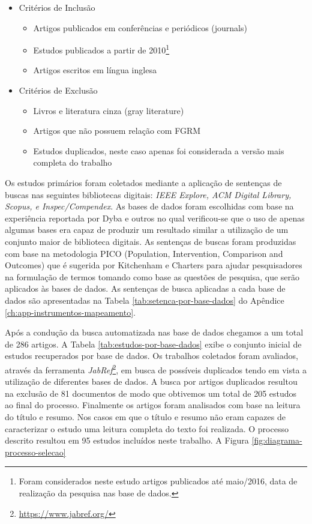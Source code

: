 \documentclass[msc]{ppgccufmg} %
\begin{document}
\begin{itemize}
	\item Critérios de Inclusão
		\begin{itemize}
			 \item Artigos publicados em conferências e periódicos (journals)
			 \item Estudos publicados a partir de 2010\footnote{Foram considerados neste estudo artigos publicados até maio/2016, data de realização da pesquisa nas base de dados.}
			 \item Artigos escritos em língua inglesa
		\end{itemize}
	\item Critérios de Exclusão
		\begin{itemize}
			\item Livros e literatura cinza (gray literature)
			\item Artigos que não possuem relação com FGRM
			\item Estudos duplicados, neste caso apenas foi considerada a versão mais completa do trabalho
		\end{itemize}
\end{itemize}

Os estudos primários foram coletados mediante a aplicação de sentenças de buscas nas seguintes bibliotecas digitais: \textit{IEEE Explore, ACM Digital Library, Scopus, e Inspec/Compendex}. As bases de dados foram escolhidas com base na experiência reportada por Dyba e outros \cite{dybaa2007applying}  no qual verificou-se que o uso de apenas algumas bases era capaz de produzir um resultado similar a utilização de um conjunto maior de biblioteca digitais. As sentenças de buscas foram produzidas com base na metodologia PICO (Population, Intervention, Comparison and Outcomes) que é sugerida por Kitchenham e Charters \cite{keele2007guidelines} para ajudar pesquisadores na formulação de termos tomando como base as questões de pesquisa, que serão aplicados às bases de dados. As sentenças de busca aplicadas a cada base de dados são apresentadas na Tabela \ref{tab:setenca-por-base-dados} do Apêndice \ref{ch:app-instrumentos-mapeamento}.


Após a condução da busca automatizada nas base de dados chegamos a um total de 286 artigos. A Tabela \ref{tab:estudos-por-base-dados} exibe o conjunto inicial de estudos recuperados por base de dados. Os trabalhos coletados foram avaliados, através da ferramenta \textit{JabRef}\footnote{\url{https://www.jabref.org/}}, em busca de possíveis duplicados tendo em vista a utilização de diferentes bases de dados. A busca por artigos duplicados resultou na exclusão de 81 documentos de modo que obtivemos um total de 205 estudos ao final do processo. Finalmente os artigos foram analisados com base na leitura do título e resumo. Nos casos em que o título e resumo não eram capazes de caracterizar o estudo uma leitura completa do texto foi realizada. O processo descrito resultou em 95 estudos incluídos neste trabalho. A Figura \ref{fig:diagrama-processo-selecao}
\end{document}
